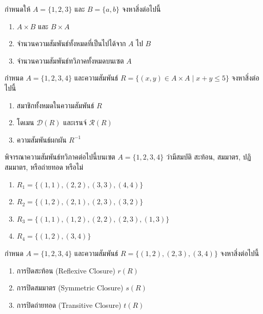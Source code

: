 \clearpage
{}

\begin{exercise}
กำหนดให้ $A = \{1, 2, 3\}$ และ $B = \{a, b\}$ จงหาสิ่งต่อไปนี้
\begin{enumerate}
    \item $A \times B$ และ $B \times A$
    \item จำนวนความสัมพันธ์ทั้งหมดที่เป็นไปได้จาก $A$ ไป $B$
    \item จำนวนความสัมพันธ์ทวิภาคทั้งหมดบนเซต $A$
\end{enumerate}
\end{exercise}

\begin{exercise}
กำหนด $A = \{1, 2, 3, 4\}$ และความสัมพันธ์ $R = \{(x,y) \in A \times A \mid x + y \le 5\}$ จงหาสิ่งต่อไปนี้
\begin{enumerate}
    \item สมาชิกทั้งหมดในความสัมพันธ์ $R$
    \item โดเมน $\mathcal{D}(R)$ และเรนจ์ $\mathcal{R}(R)$
    \item ความสัมพันธ์ผกผัน $R^{-1}$
\end{enumerate}
\end{exercise}

\begin{exercise}
พิจารณาความสัมพันธ์ทวิภาคต่อไปนี้บนเซต $A = \{1, 2, 3, 4\}$ ว่ามีสมบัติ สะท้อน, สมมาตร, ปฏิสมมาตร, หรือถ่ายทอด หรือไม่
\begin{enumerate}
    \item $R_1 = \{(1,1), (2,2), (3,3), (4,4)\}$
    \item $R_2 = \{(1,2), (2,1), (2,3), (3,2)\}$
    \item $R_3 = \{(1,1), (1,2), (2,2), (2,3), (1,3)\}$
    \item $R_4 = \{(1,2), (3,4)\}$
\end{enumerate}
\end{exercise}

\begin{exercise}
กำหนด $A = \{1, 2, 3, 4\}$ และความสัมพันธ์ $R = \{(1,2), (2,3), (3,4)\}$ จงหาสิ่งต่อไปนี้
\begin{enumerate}
    \item การปิดสะท้อน (Reflexive Closure) $r(R)$
    \item การปิดสมมาตร (Symmetric Closure) $s(R)$
    \item การปิดถ่ายทอด (Transitive Closure) $t(R)$
\end{enumerate}
\end{exercise}

